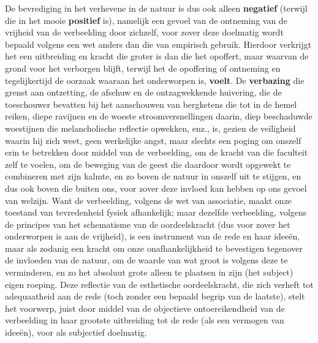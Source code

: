 De bevrediging in het verhevene in de natuur is dus ook alleen \textbf{negatief} (terwijl die in het mooie \textbf{positief} is), namelijk een gevoel van de ontneming van de vrijheid van de verbeelding door zichzelf, voor zover deze doelmatig wordt bepaald volgens een wet anders dan die van empirisch gebruik. Hierdoor verkrijgt het een uitbreiding en kracht die groter is dan die het opoffert, maar waarvan de grond voor het verborgen blijft, terwijl het de opoffering of ontneming en tegelijkertijd de oorzaak waaraan het onderworpen is, \textbf{voelt}. De \textbf{verbazing} die grenst aan ontzetting, de afschuw en de ontzagwekkende huivering, die de toeschouwer bevatten bij het aanschouwen van bergketens die tot in de hemel reiken, diepe ravijnen en de woeste stroomversnellingen daarin, diep beschaduwde woestijnen die melancholische reflectie opwekken, enz., is, gezien de veiligheid waarin hij zich weet, geen werkelijke angst, maar slechts een poging om onszelf erin te betrekken door middel van de verbeelding, om de kracht van die faculteit zelf te voelen, om de beweging van de geest die daardoor wordt opgewekt te combineren met zijn kalmte, en zo boven de natuur in onszelf uit te stijgen, en dus ook boven die buiten ons, voor zover deze invloed kan hebben op ons gevoel van welzijn. Want de verbeelding, volgens de wet van associatie, maakt onze toestand van tevredenheid fysiek afhankelijk; maar dezelfde verbeelding, volgens de principes van het schematisme van de oordeelskracht (dus voor zover het onderworpen is aan de vrijheid), is een instrument van de rede en haar ideeën, maar als zodanig een kracht om onze onafhankelijkheid te bevestigen tegenover de invloeden van de natuur, om de waarde van wat groot is volgens deze te verminderen, en zo het absoluut grote alleen te plaatsen in zijn (het subject) eigen roeping. Deze reflectie van de esthetische oordeelskracht, die zich verheft tot adequaatheid aan de rede (toch zonder een bepaald begrip van de laatste), stelt het voorwerp, juist door middel van de objectieve ontoereikendheid van de verbeelding in haar grootste uitbreiding tot de rede (als een vermogen van ideeën), voor als subjectief doelmatig.

